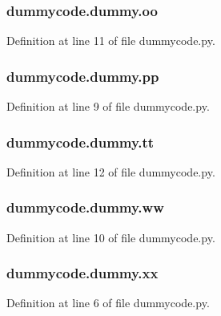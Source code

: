 \subsubsection[{oo}]{\setlength{\rightskip}{0pt plus 5cm}dummycode.\-dummy.\-oo}\label{classdummycode_1_1dummy_a49635a45286e102fb960d0bc4f4c3621}


Definition at line 11 of file dummycode.\-py.

\subsubsection[{pp}]{\setlength{\rightskip}{0pt plus 5cm}dummycode.\-dummy.\-pp}\label{classdummycode_1_1dummy_a4ded8e4fa38d817b96c7b21a869a16ae}


Definition at line 9 of file dummycode.\-py.

\subsubsection[{tt}]{\setlength{\rightskip}{0pt plus 5cm}dummycode.\-dummy.\-tt}\label{classdummycode_1_1dummy_ac1a6206c9bd102d051018258c3b54de9}


Definition at line 12 of file dummycode.\-py.

\subsubsection[{ww}]{\setlength{\rightskip}{0pt plus 5cm}dummycode.\-dummy.\-ww}\label{classdummycode_1_1dummy_a65b1604eb43ffa41eb49a02655397fb7}


Definition at line 10 of file dummycode.\-py.

\subsubsection[{xx}]{\setlength{\rightskip}{0pt plus 5cm}dummycode.\-dummy.\-xx}\label{classdummycode_1_1dummy_af1ae41fb24a1c0a52ae60bd1f2db9f5f}


Definition at line 6 of file dummycode.\-py.


